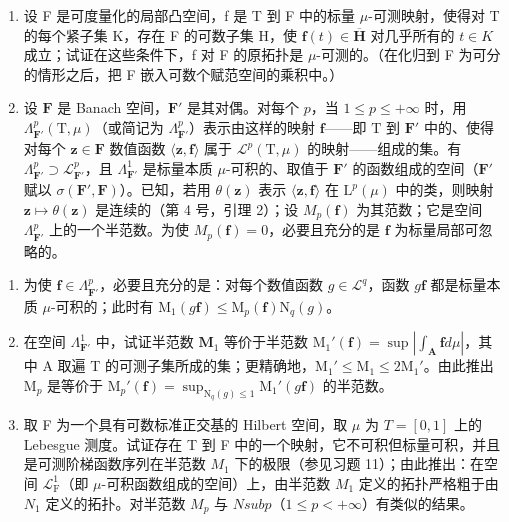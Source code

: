 \begin{enumerate}
\def\labelenumi{\arabic{enumi})}
\setcounter{enumi}{14}
\item
  设 F 是可度量化的局部凸空间，f 是 T 到 F 中的标量 \(\mu\)-可测映射，使得对 T 的每个紧子集 K，存在 F 的可数子集 H，使 \(\mathbf{f}(t) \in \overline{\mathbf{H}}\) 对几乎所有的 \(t \in K\) 成立；试证在这些条件下，f 对 F 的原拓扑是 \(\mu\)-可测的。（在化归到 F 为可分的情形之后，把 F 嵌入可数个赋范空间的乘积中。）
\item
  设 \(\mathbf{F}\) 是 Banach 空间，\(\mathbf{F}'\) 是其对偶。对每个 \(p\)，当 \(1 \leqslant p \leqslant +\infty\) 时，用 \(\Lambda_{\mathbf{F}'}^p(\mathrm{T},\mu)\)（或简记为 \(\Lambda_{\mathbf{F}'}^p\)）表示由这样的映射 \(\mathbf{f}\)——即 \(\mathrm{T}\) 到 \(\mathbf{F}'\) 中的、使得对每个 \(\mathbf{z} \in \mathbf{F}\) 数值函数 \(\langle \mathbf{z},\mathbf{f}\rangle\) 属于 \(\mathcal{L}^p(\mathrm{T},\mu)\) 的映射——组成的集。有 \(\Lambda_{\mathbf{F}'}^p \supset \mathcal{L}_{\mathbf{F}'}^p\)，且 \(\Lambda_{\mathbf{F}'}^1\) 是标量本质 \(\mu\)-可积的、取值于 \(\mathbf{F}'\) 的函数组成的空间（\(\mathbf{F}'\) 赋以 \(\sigma(\mathbf{F}',\mathbf{F})\)）。已知，若用 \(\theta(\mathbf{z})\) 表示 \(\langle \mathbf{z},\mathbf{f}\rangle\) 在 \(\mathrm{L}^p(\mu)\) 中的类，则映射 \(\mathbf{z} \mapsto \theta(\mathbf{z})\) 是连续的（第 4 号，引理 2）；设 \(M_p(\mathbf{f})\) 为其范数；它是空间 \(\Lambda_{\mathbf{F}'}^p\) 上的一个半范数。为使 \(M_p(\mathbf{f}) = 0\)，必要且充分的是 \(\mathbf{f}\) 为标量局部可忽略的。
\end{enumerate}

\begin{enumerate}
\def\labelenumi{\alph{enumi})}
\item
  为使 \(\mathbf{f} \in \Lambda_{\mathbf{F}'}^p\)，必要且充分的是：对每个数值函数 \(g \in \mathcal{L}^q\)，函数 \(g\mathbf{f}\) 都是标量本质 \(\mu\)-可积的；此时有 \(\mathrm{M}_1(g\mathbf{f}) \leqslant \mathrm{M}_p(\mathbf{f})\mathrm{N}_q(g)\)。
\item
  在空间 \(\Lambda_{\mathbf{F}'}^1\) 中，试证半范数 \(\mathbf{M}_1\) 等价于半范数 \(\mathrm{M}_1'(\mathbf{f}) = \sup |\int_{\mathbf{A}} \mathbf{f} d\mu|\)，其中 A 取遍 T 的可测子集所成的集；更精确地，\(\mathrm{M}_1' \leqslant \mathrm{M}_1 \leqslant 2\mathrm{M}_1'\)。由此推出 \(\mathrm{M}_p\) 是等价于 \(\mathrm{M}_p'(\mathbf{f}) = \sup_{\mathrm{N}_q(g) \leqslant 1} \mathrm{M}_1'(g\mathbf{f})\) 的半范数。
\item
  取 F 为一个具有可数标准正交基的 Hilbert 空间，取 \(\mu\) 为 \(T = [0,1]\) 上的 Lebesgue 测度。试证存在 T 到 F 中的一个映射，它不可积但标量可积，并且是可测阶梯函数序列在半范数 \(M_1\) 下的极限（参见习题 11）；由此推出：在空间 \(\mathcal{L}_{\mathrm{F}}^1\)（即 \(\mu\)-可积函数组成的空间）上，由半范数 \(M_1\) 定义的拓扑严格粗于由 \(N_1\) 定义的拓扑。对半范数 \(M_p\) 与 \(N sub p\)（\(1 \leqslant p < +\infty\)）有类似的结果。
\end{enumerate}

